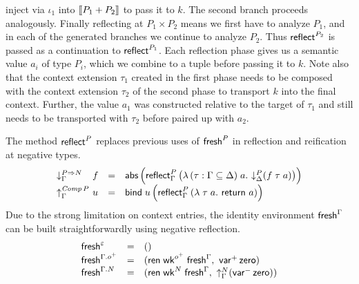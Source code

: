 \documentclass[a4paper,USenglish,cleveref, autoref]{lipics-v2019}
\begin{document}
inject via $\iota_1$ into $\mathopen{{[\kern-0.14em[}} P_1 + P_2 \mathclose{{]\kern-0.14em]}}$ to pass it to $k$.  The
second branch proceeds analogously.
Finally reflecting at $P_1 \times P_2$ means we first have to analyze
$P_1$, and in each of the generated branches we continue to analyze
$P_2$.  Thus $\mathsf{reflect}_{}^{P_2}$ is passed as a continuation to
$\mathsf{reflect}_{}^{P_1}$.  Each reflection phase gives us a semantic value
$a_i$ of type $P_i$, which we combine to a tuple before passing it to
$k$.  Note also that the context extension $\tau_1$ created in the
first phase needs to be composed with the context extension $\tau_2$
of the second phase to transport $k$ into the final context.  Further,
the value $a_1$ was constructed relative to the target of
$\tau_1$ and still needs
to be transported with $\tau_2$ before paired up with $a_2$.

The method $\mathsf{reflect}_{}^{P}$ replaces previous uses of $\mathsf{fresh}^P$ in
reflection and reification at negative types.
\[
\begin{array}{l@{~}lcl}
  \downG {P \To N} & f & = & \tabs
    \left(
      \reflect[\Gamma] P
        \left(
          \lambda \, (\tau : \Gamma \sublist \Delta) \; a .\
          \down[\Delta] P (f \; \tau \; a)
        \right)
    \right)
  \\
  \upG {\Comp P} & u & = & \tbind \; u
    \left(
      \reflect[\Gamma] P
        \left(
          \lambda \; \tau \; a .\
          \treturn\; a
        \right)
    \right)
\end{array}
\]
Due to the strong limitation on context entries,
the identity environment $\mathsf{fresh}^{\Gamma}$ can be built
straightforwardly using negative reflection.
\[
\begin{array}{lcl}
  \mathsf{fresh}^{\varepsilon} & = & () \\
  \mathsf{fresh}^{\Gamma.o^+} & = &
    (
      \mathsf{ren}\;\mathsf{wk}^{o^+}\;\mathsf{fresh}^{\Gamma}
      , \
      \mathsf{var}^{+}\,\mathsf{zero}
    ) \\
  \mathsf{fresh}^{\Gamma.N} & = &
    (
      \mathsf{ren}\;\mathsf{wk}^N\;\mathsf{fresh}^{\Gamma}
      , \
      \mathord{\uparrow_{\Gamma}^{N}} (\mathsf{var}^{-}\,\mathsf{zero})
    ) \\
\end{array}
\]
\end{document}
